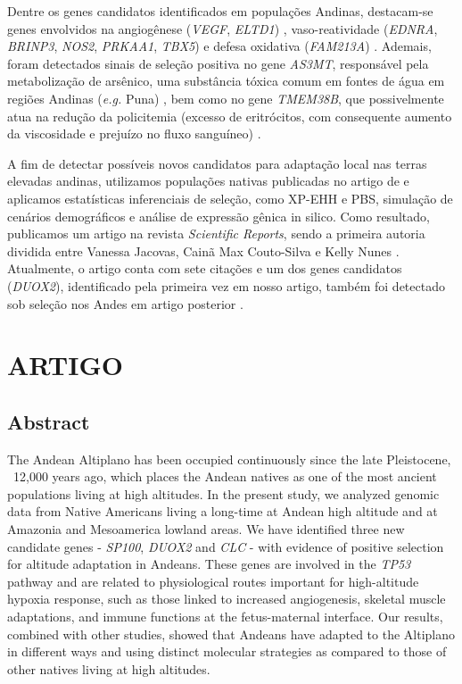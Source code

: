 Dentre os genes candidatos identificados em populações Andinas, destacam-se genes envolvidos na angiogênese (\textsl{VEGF}, \textsl{ELTD1}) \cite{eichstaedt_andean_2014}, vaso-reatividade (\textsl{EDNRA}, \textsl{BRINP3}, \textsl{NOS2}, \textsl{PRKAA1}, \textsl{TBX5}) \cite{bigham_identifying_2009, bigham_identifying_2010, crawford_natural_2017} e defesa oxidativa (\textsl{FAM213A}) \cite{valverde_novel_2015}. Ademais, foram detectados sinais de seleção positiva no gene \textsl{AS3MT}, responsável pela metabolização de arsênico, uma substância tóxica comum em fontes de água em regiões Andinas (\emph{e.g.} Puna) \cite{eichstaedt_positive_2015}, bem como no gene \textsl{TMEM38B}, que possivelmente atua na redução da policitemia (excesso de eritrócitos, com consequente aumento da viscosidade e prejuízo no fluxo sanguíneo) \cite{crawford_natural_2017}.

A fim de detectar possíveis novos candidatos para adaptação local nas terras elevadas andinas, utilizamos populações nativas publicadas no artigo de  e aplicamos estatísticas inferenciais de seleção, como XP-EHH e PBS, simulação de cenários demográficos e análise de expressão gênica in silico. Como resultado, publicamos um artigo na revista \textit{Scientific Reports}, sendo a primeira autoria dividida entre Vanessa Jacovas, Cainã Max Couto-Silva e Kelly Nunes \cite{jacovas_selection_2018}. Atualmente, o artigo conta com sete citações e um dos genes candidatos (\textsl{DUOX2}), identificado pela primeira vez em nosso artigo, também foi detectado sob seleção nos Andes em artigo posterior \cite{borda_genetic_2020}.

\section{ARTIGO}
\label{cap3:andes_artigo}


\subsection*{Abstract}

The Andean Altiplano has been occupied continuously since the late Pleistocene, ~12,000 years ago, which places the Andean natives as one of the most ancient populations living at high altitudes. In the present study, we analyzed genomic data from Native Americans living a long-time at Andean high altitude and at Amazonia and Mesoamerica lowland areas. We have identified three new candidate genes - \textsl{SP100}, \textsl{DUOX2} and \textsl{CLC} - with evidence of positive selection for altitude adaptation in Andeans. These genes are involved in the \textsl{TP53} pathway and are related to physiological routes important for high-altitude hypoxia response, such as those linked to increased angiogenesis, skeletal muscle adaptations, and immune functions at the fetus-maternal interface. Our results, combined with other studies, showed that Andeans have adapted to the Altiplano in different ways and using distinct molecular strategies as compared to those of other natives living at high altitudes.

